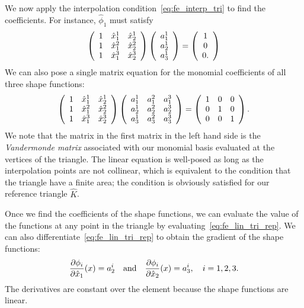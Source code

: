 We now apply the interpolation condition~\eqref{eq:fe_interp_tri} to find the coefficients.  For instance, $\hat \phi_1$ must satisfy
\begin{equation*}
  \bmat{ccc}
  1 & \hat x_1^1 & \hat x_2^1 \\
  1 & \hat x_1^2 & \hat x_2^2 \\
  1 & \hat x_1^3 & \hat x_2^3 \\
  \emat
  \bmat{ccc}
  a_1^1 \\ a_2^1 \\ a_3^1
  \emat
  =
  \bmat{ccc}
  1 \\ 0 \\ 0.
  \emat
\end{equation*}
We can also pose a single matrix equation for the monomial coefficients of all three shape functions: 
\begin{equation*}
  \bmat{ccc}
  1 & \hat x_1^1 & \hat x_2^1 \\
  1 & \hat x_1^2 & \hat x_2^2 \\
  1 & \hat x_1^3 & \hat x_2^3 \\
  \emat
  \bmat{ccc}
  a_1^1 & a_1^2 & a_1^3 \\
  a_2^1 & a_2^2 & a_2^3 \\
  a_3^1 & a_3^2 & a_3^3 \\
  \emat
  =
  \bmat{ccc}
  1 & 0 & 0 \\
  0 & 1 & 0 \\
  0 & 0 & 1
  \emat.
\end{equation*}
We note that the matrix in the first matrix in the left hand side is the \emph{Vandermonde matrix} associated with our monomial basis evaluated at the vertices of the triangle.  The linear equation is well-posed as long as the interpolation points are not collinear, which is equivalent to the condition that the triangle have a finite area; the condition is obviously satisfied for our reference triangle $\hat K$.

Once we find the coefficients of the shape functions, we can evaluate the value of the functions at any point in the triangle by evaluating~\eqref{eq:fe_lin_tri_rep}. We can also differentiate~\eqref{eq:fe_lin_tri_rep} to obtain the gradient of the shape functions:
\begin{align*}
  \pp{\phi_i}{\hat x_1}(x) = a_2^i
  \quad \text{and} \quad
  \pp{\phi_i}{\hat x_2}(x) = a_3^i, \quad i = 1,2,3.
\end{align*}
The derivatives are constant over the element because the shape functions are linear.

